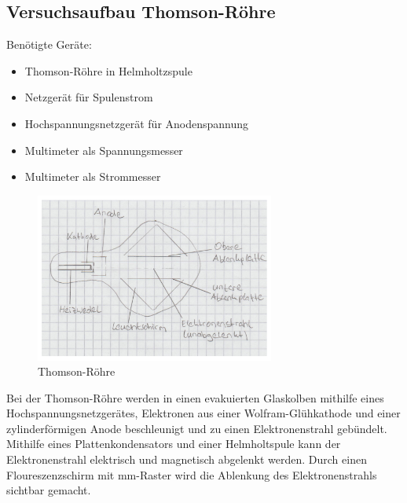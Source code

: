 \documentclass[a4paper,10pt]{scrartcl}
\begin{document}
	\subsection{Versuchsaufbau Thomson-Röhre}
	Benötigte Geräte:
	\begin{itemize}
\item Thomson-Röhre in Helmholtzspule
\item Netzgerät für Spulenstrom
\item Hochspannungsnetzgerät für Anodenspannung
\item Multimeter als Spannungsmesser
\item Multimeter als Strommesser
\end{itemize}
\begin{figure}
\centering
\includegraphics[width=0.7\textwidth]{./Bilder/emthomson}
\caption{Thomson-Röhre}
\end{figure}
Bei der Thomson-Röhre werden in einen evakuierten Glaskolben mithilfe eines Hochspannungsnetzgerätes, Elektronen aus einer Wolfram-Glühkathode und einer zylinderförmigen Anode beschleunigt und zu einen Elektronenstrahl gebündelt. Mithilfe eines Plattenkondensators und einer Helmholtspule kann der Elektronenstrahl elektrisch und magnetisch abgelenkt werden. Durch einen Floureszenzschirm mit mm-Raster wird die Ablenkung des Elektronenstrahls sichtbar gemacht.
\FloatBarrier
\end{document}

